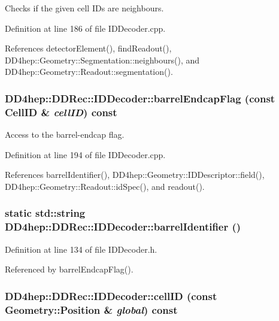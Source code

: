 Checks if the given cell IDs are neighbours. 

Definition at line 186 of file IDDecoder.cpp.

References detectorElement(), findReadout(), DD4hep::Geometry::Segmentation::neighbours(), and DD4hep::Geometry::Readout::segmentation().\hypertarget{class_d_d4hep_1_1_d_d_rec_1_1_i_d_decoder_adce672d88469b43ba90d51e24ce85490}{
\subsubsection[{barrelEndcapFlag}]{ DD4hep::DDRec::IDDecoder::barrelEndcapFlag (const {\bf CellID} \& {\em cellID}) const}}
\label{class_d_d4hep_1_1_d_d_rec_1_1_i_d_decoder_adce672d88469b43ba90d51e24ce85490}


Access to the barrel-\/endcap flag. 

Definition at line 194 of file IDDecoder.cpp.

References barrelIdentifier(), DD4hep::Geometry::IDDescriptor::field(), DD4hep::Geometry::Readout::idSpec(), and readout().\hypertarget{class_d_d4hep_1_1_d_d_rec_1_1_i_d_decoder_ac5bd93061aef3850d7aca8711e8a507f}{
\subsubsection[{barrelIdentifier}]{\setlength{\rightskip}{0pt plus 5cm}static std::string DD4hep::DDRec::IDDecoder::barrelIdentifier ()}}
\label{class_d_d4hep_1_1_d_d_rec_1_1_i_d_decoder_ac5bd93061aef3850d7aca8711e8a507f}


Definition at line 134 of file IDDecoder.h.

Referenced by barrelEndcapFlag().\hypertarget{class_d_d4hep_1_1_d_d_rec_1_1_i_d_decoder_a0eb7cd447af5964d4705cb79ffe311b2}{
\subsubsection[{cellID}]{ DD4hep::DDRec::IDDecoder::cellID (const {\bf Geometry::Position} \& {\em global}) const}}
\label{class_d_d4hep_1_1_d_d_rec_1_1_i_d_decoder_a0eb7cd447af5964d4705cb79ffe311b2}


